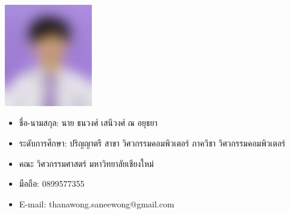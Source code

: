 \documentclass[semifinal]{cpecmu}
\author{นายกฤษฏิ์ อุปนันท์}{Krit Upanun}{600610717}
\author{นายธนวงศ์ เสนีวงศ์ ณ อยุธยา}{Thanawong Saneewong Na Ayutthaya}{600610738}
\begin{document}


\pagestyle{empty}\cleardoublepage
\normalspacing \setcounter{page}{1}  \pagestyle{cpecmu}





\ifproject

\fi



\ifproject
\appendix


\ifglossary\glossarypage\fi

\ifindex\indexpage\fi

\begin{biosketch}
\begin{center}
  \includegraphics[width=1.5in]{mugshot.jpg}
\end{center}
\begin{itemize}[label={},leftmargin=*]
  \item ชื่อ-นามสกุล: นาย ธนวงศ์ เสนีวงศ์ ณ อยุธยา
  \item ระดับการศึกษา: ปริญญาตรี สาขา วิศวกรรมคอมพิวเตอร์ ภาควิชา วิศวกรรมคอมพิวเตอร์
  \item คณะ วิศวกรรมศาสตร์ มหาวิทยาลัยเชียงใหม่
  \item มือถือ: 0899577355 
  \item E-mail: thanawong.saneewong@gmail.com
\end{itemize}



\end{biosketch}
\end{document}
